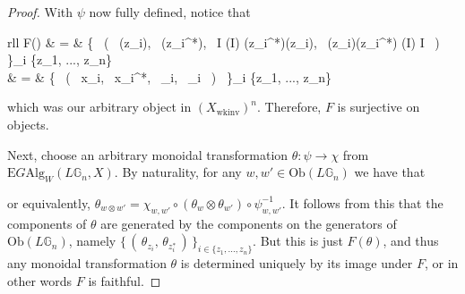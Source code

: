 \documentclass{amsart} %
\newenvironment{eq*}{\begin{equation*}}{\end{equation*}}
\begin{document}
\begin{proof}
With $\psi$ now fully defined, notice that
\begin{eq*} \begin{array}{rll}
		F(\psi) & = & \big\{ \, ( \, \psi(z_i), \, \psi(z_i^*), \, I \xrightarrow{\sim} \psi(I) \xrightarrow{\sim} \psi(z_i^*)\psi(z_i), \, \psi(z_i)\psi(z_i^*) \xrightarrow{\sim} \psi(I) \xrightarrow{\sim} I \, ) \, \big\}_{i \in \{z_1, ..., z_n\} } \\
		& = & \big\{ \, ( \, x_i, \, x_i^*, \, \eta_i, \, \epsilon_i \, ) \, \big\}_{i \in \{z_1, ..., z_n\} } \\
		\end{array}
\end{eq*}
which was our arbitrary object in $(X_{\mathrm{wkinv}})^n$. Therefore, $F$ is surjective on objects.

Next, choose an arbitrary monoidal transformation $\theta : \psi \to \chi$ from $\mathrm{E}G\mathrm{Alg}_W(L\mathbb{G}_n, X)$. By naturality, for any $w, w' \in \mathrm{Ob}(L\mathbb{G}_n)$ we have that
\begin{eq*} 
\end{eq*}
or equivalently, $\theta_{w \otimes w'} = \chi_{w, w'} \circ (\theta_w \otimes \theta_{w'}) \circ \psi_{w, w'}^{-1}$. It follows from this that the components of $\theta$ are generated by the components on the generators of $\mathrm{Ob}(L\mathbb{G}_n)$, namely $\{ \, ( \, \theta_{z_i}, \, \theta_{z_i^*} \, ) \, \}_{i \in \{z_1, ..., z_n\} }$. But this is just $F(\theta)$, and thus any monoidal transformation $\theta$ is determined uniquely by its image under $F$, or in other words $F$ is faithful.


\end{proof}
\end{document}
